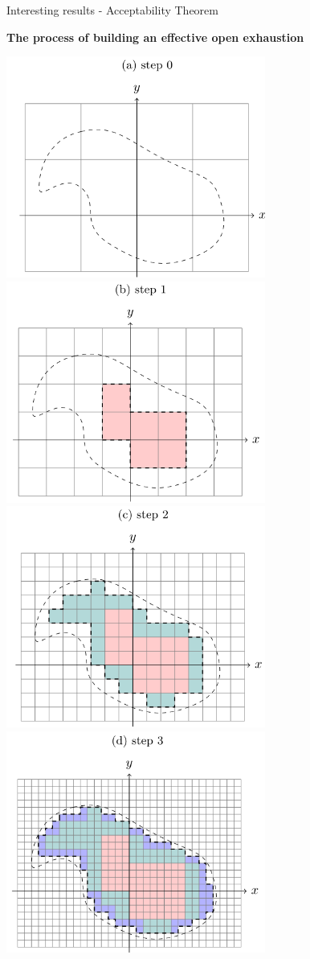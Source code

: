 \begin{frame}{Interesting results - Acceptability Theorem }
\begin{minipage}[t]{0.45\linewidth}
    \end{minipage}
    \begin{minipage}[t]{0.54\linewidth}
        \center
        \pause
        \vspace{-1em}
        \color{Mahogany}
        \textbf{The process of building an effective open exhaustion}
        \vspace{-1em}
        \begin{flushright}
            \pause
            \includegraphics[width=0.48\linewidth]{tikz/step0.png}
            \pause
            \includegraphics[width=0.48\linewidth]{tikz/step1.png}
            \pause
            \includegraphics[width=0.48\linewidth]{tikz/step2.png}
            \pause
            \includegraphics[width=0.48\linewidth]{tikz/step3.png}
        \end{flushright}
    \end{minipage}
\end{frame}